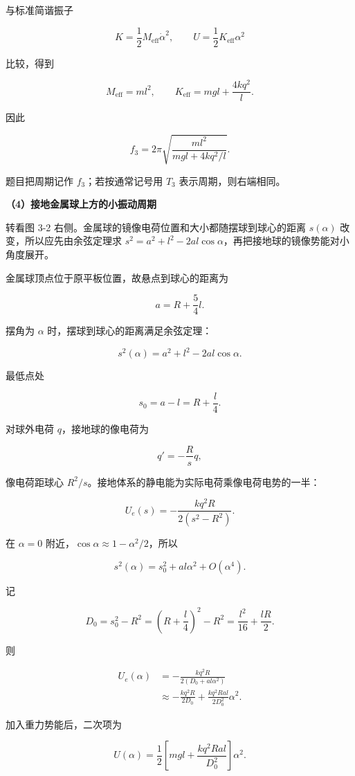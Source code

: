 \documentclass[12pt,a4paper,UTF8]{ctexart}
\begin{document}
与标准简谐振子

\[K=\frac12M_{\mathrm{eff}}\dot\alpha^2,\qquad
U=\frac12K_{\mathrm{eff}}\alpha^2\]

比较，得到

\[M_{\mathrm{eff}}=ml^2,\qquad
K_{\mathrm{eff}}=mgl+\frac{4kq^2}{l}.\]

因此

\[\boxed{
f_3=2\pi\sqrt{\frac{ml^2}{mgl+4kq^2/l}}
}. \tag{16}\]

题目把周期记作 \(f_3\)；若按通常记号用 \(T_3\) 表示周期，则右端相同。

\textbf{（4）接地金属球上方的小振动周期}

转看图 3-2 右侧。金属球的镜像电荷位置和大小都随摆球到球心的距离
\(s(\alpha)\) 改变，所以应先由余弦定理求
\(s^2=a^2+l^2-2al\cos\alpha\)，再把接地球的镜像势能对小角度展开。

金属球顶点位于原平板位置，故悬点到球心的距离为

\[a=R+\frac54l. \tag{17}\]

摆角为 \(\alpha\) 时，摆球到球心的距离满足余弦定理：

\[s^2(\alpha)=a^2+l^2-2al\cos\alpha. \tag{18}\]

最低点处

\[s_0=a-l=R+\frac l4. \tag{19}\]

对球外电荷 \(q\)，接地球的像电荷为

\[q'=-\frac{R}{s}q,\]

像电荷距球心 \(R^2/s\)。接地体系的静电能为实际电荷乘像电荷电势的一半：

\[U_e(s)=-\frac{kq^2R}{2(s^2-R^2)}. \tag{20}\]

在 \(\alpha=0\) 附近，\(\cos\alpha\approx1-\alpha^2/2\)，所以

\[s^2(\alpha)=s_0^2+al\alpha^2+O(\alpha^4). \tag{21}\]

记

\[D_0=s_0^2-R^2
=\left(R+\frac l4\right)^2-R^2
=\frac{l^2}{16}+\frac{lR}{2}. \tag{22}\]

则

\[\begin{aligned}
U_e(\alpha)
&=-\frac{kq^2R}{2(D_0+al\alpha^2)}\\
&\approx-\frac{kq^2R}{2D_0}
+\frac{kq^2Ral}{2D_0^2}\alpha^2.
\end{aligned} \tag{23}\]

加入重力势能后，二次项为

\[U(\alpha)=\frac12\left[mgl+
\frac{kq^2Ral}{D_0^2}\right]\alpha^2. \tag{24}\]
\end{document}
